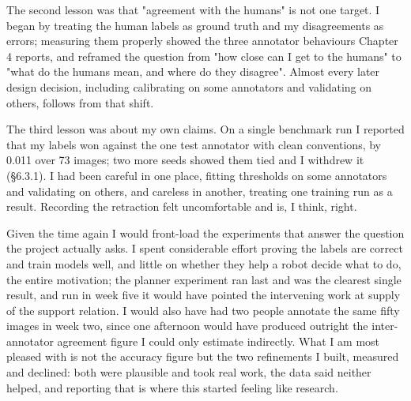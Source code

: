 The second lesson was that "agreement with the humans" is not one target. I began by treating the human labels as ground truth and my disagreements as errors; measuring them properly showed the three annotator behaviours Chapter 4 reports, and reframed the question from "how close can I get to the humans" to "what do the humans mean, and where do they disagree". Almost every later design decision, including calibrating on some annotators and validating on others, follows from that shift.

The third lesson was about my own claims. On a single benchmark run I reported that my labels won against the one test annotator with clean conventions, by 0.011 over 73 images; two more seeds showed them tied and I withdrew it (\S{}6.3.1). I had been careful in one place, fitting thresholds on some annotators and validating on others, and careless in another, treating one training run as a result. Recording the retraction felt uncomfortable and is, I think, right.

Given the time again I would front-load the experiments that answer the question the project actually asks. I spent considerable effort proving the labels are correct and train models well, and little on whether they help a robot decide what to do, the entire motivation; the planner experiment ran last and was the clearest single result, and run in week five it would have pointed the intervening work at supply of the support relation. I would also have had two people annotate the same fifty images in week two, since one afternoon would have produced outright the inter-annotator agreement figure I could only estimate indirectly. What I am most pleased with is not the accuracy figure but the two refinements I built, measured and declined: both were plausible and took real work, the data said neither helped, and reporting that is where this started feeling like research.